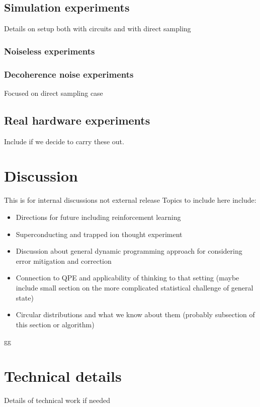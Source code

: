 \documentclass[a4paper,onecolumn,11pt,unpublished]{quantumarticle}
\begin{document}
\subsection{Simulation experiments}
Details on setup both with circuits and with direct sampling



\subsubsection{Noiseless experiments}

\subsubsection{Decoherence noise experiments}
Focused on direct sampling case

\subsection{Real hardware experiments}
Include if we decide to carry these out.


\section{Discussion}
This is for internal discussions not external release
Topics to include here include:
\begin{itemize}
	\item Directions for future including reinforcement learning
	\item Superconducting and trapped ion thought experiment
	\item Discussion about general dynamic programming approach for considering error mitigation and correction
	\item Connection to QPE and applicability of thinking to that setting (maybe include small section on the more complicated statistical challenge of general state)
	\item Circular distributions and what we know about them (probably subsection of this section or algorithm)
\end{itemize}



\begin{thebibliography}{9}


gg
\end{thebibliography}




\appendix

\section{Technical details}
Details of technical work if needed
\end{document}
